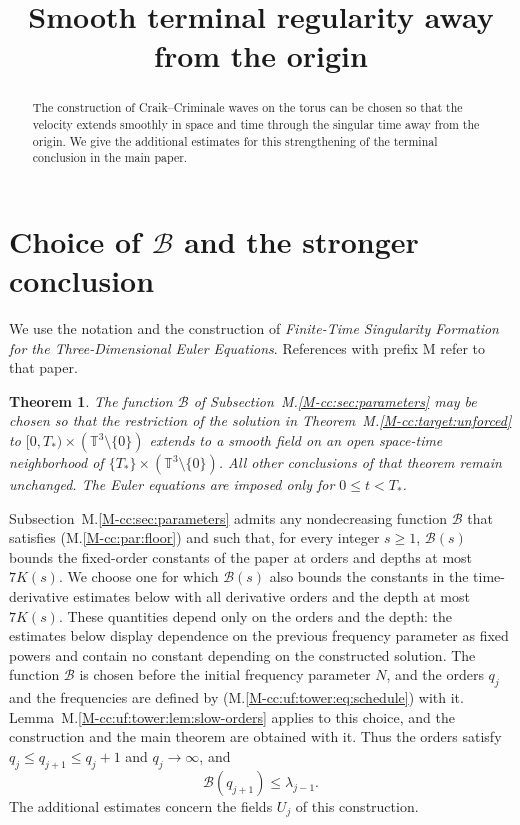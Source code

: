 \documentclass[11pt]{amsart}
\title[Smooth terminal regularity]{Smooth terminal regularity away from the origin}
\author{}\date{}
\numberwithin{equation}{section}
\newtheorem{theorem}{Theorem}[section]
\begin{document}
\raggedbottom
\begin{abstract}
The construction of Craik--Criminale waves on the torus can be chosen so that
the velocity extends smoothly in space and time through the singular time
away from the origin. We give the additional estimates for this strengthening
of the terminal conclusion in the main paper.
\end{abstract}
\maketitle

\section{Choice of \texorpdfstring{$\mathcal B$}{B} and the stronger conclusion}

We use the notation and the construction of
\emph{Finite-Time Singularity Formation for the Three-Dimensional Euler Equations}. References with prefix M refer to that paper.

\begin{theorem}\label{aux:terminal:smooth}
The function $\mathcal B$ of Subsection~M.\ref{M-cc:sec:parameters} may be chosen so that
the restriction of the solution in Theorem~M.\ref{M-cc:target:unforced} to
$[0,T_*)\times(\mathbb T^3\setminus\{0\})$ extends to a smooth field on an
open space-time neighborhood of
$\{T_*\}\times(\mathbb T^3\setminus\{0\})$.
All other conclusions of that theorem remain unchanged.
The Euler equations are imposed only for $0\le t<T_*$.
\end{theorem}

Subsection~M.\ref{M-cc:sec:parameters} admits any nondecreasing
function $\mathcal B$ that satisfies \textup{(M.\ref{M-cc:par:floor})}
and such that, for every integer $s\ge1$, $\mathcal B(s)$ bounds the
fixed-order constants of the paper at orders and depths at most
$7K(s)$. We choose one for which $\mathcal B(s)$ also bounds the
constants in the time-derivative estimates below with all derivative
orders and the depth at most $7K(s)$.
These quantities depend only on the orders and the depth:
the estimates below display dependence on the previous frequency parameter as fixed
powers and contain no constant depending on the constructed solution.
The function $\mathcal B$ is chosen before the initial frequency
parameter $N$, and the orders $q_j$ and the frequencies are defined by
\textup{(M.\ref{M-cc:uf:tower:eq:schedule})} with it.
Lemma~M.\ref{M-cc:uf:tower:lem:slow-orders} applies to this choice,
and the construction and the main theorem are obtained with it. Thus
the orders satisfy $q_j\le q_{j+1}\le q_j+1$ and $q_j\to\infty$, and
\begin{equation}\label{aux:terminal:growth}
 \mathcal B(q_{j+1})\le\lambda_{j-1}.
\end{equation}
The additional estimates concern the fields $U_j$ of this construction.
\end{document}
